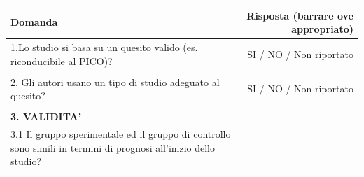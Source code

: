 \documentclass[]{book}
\begin{document}
\begin{longtable}[]{@{}lr@{}}
\toprule
\begin{minipage}[b]{0.47\columnwidth}\raggedright
Domanda\strut
\end{minipage} & \begin{minipage}[b]{0.47\columnwidth}\raggedleft
Risposta (barrare ove appropriato)\strut
\end{minipage}\tabularnewline
\midrule
\endhead
\begin{minipage}[t]{0.47\columnwidth}\raggedright
1.Lo studio si basa su un quesito valido (es. riconducibile al PICO)?\strut
\end{minipage} & \begin{minipage}[t]{0.47\columnwidth}\raggedleft
SI / NO / Non riportato\strut
\end{minipage}\tabularnewline
\begin{minipage}[t]{0.47\columnwidth}\raggedright
\strut
\end{minipage} & \begin{minipage}[t]{0.47\columnwidth}\raggedleft
\strut
\end{minipage}\tabularnewline
\begin{minipage}[t]{0.47\columnwidth}\raggedright
2. Gli autori usano un tipo di studio adeguato al quesito?\strut
\end{minipage} & \begin{minipage}[t]{0.47\columnwidth}\raggedleft
SI / NO / Non riportato\strut
\end{minipage}\tabularnewline
\begin{minipage}[t]{0.47\columnwidth}\raggedright
\strut
\end{minipage} & \begin{minipage}[t]{0.47\columnwidth}\raggedleft
\strut
\end{minipage}\tabularnewline
\begin{minipage}[t]{0.47\columnwidth}\raggedright
\textbf{3. VALIDITA'}\strut
\end{minipage} & \begin{minipage}[t]{0.47\columnwidth}\raggedleft
\strut
\end{minipage}\tabularnewline
\begin{minipage}[t]{0.47\columnwidth}\raggedright
3.1 Il gruppo sperimentale ed il gruppo di controllo sono simili in termini di prognosi all'inizio dello studio?\strut
\end{minipage} & \begin{minipage}[t]{0.47\columnwidth}\raggedleft

\end{minipage}
\end{longtable}
\end{document}
